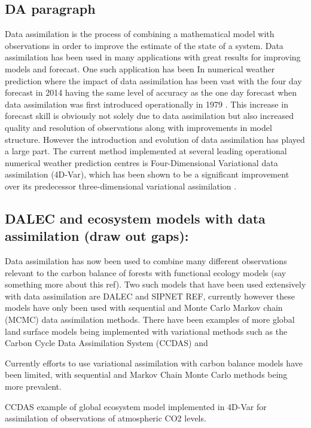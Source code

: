 \documentclass[11pt]{article}
\begin{document}
\subsection{DA paragraph}
Data assimilation is the process of combining a mathematical model with observations in order to improve the estimate of the state of a system. Data assimilation has been used in many applications with great results for improving models and forecast. One such application has been In numerical weather prediction where the impact of data assimilation has been vast with the four day forecast in 2014 having the same level of accuracy as the one day forecast when data assimilation was first introduced operationally in 1979 \citep{rabier2005overview, kalnay2003atmospheric}. This increase in forecast skill is obviously not solely due to data assimilation but also increased quality and resolution of observations along with improvements in model structure. However the introduction and evolution of data assimilation has played a large part. The current method implemented at several leading operational numerical weather prediction centres is Four-Dimensional Variational data assimilation (4D-Var), which has been shown to be a significant improvement over its predecessor three-dimensional variational assimilation \citep{lorenc2005does}.

\subsection{DALEC and ecosystem models with data assimilation (draw out gaps):}

Data assimilation has now been used to combine many different observations relevant to the carbon balance of forests with functional ecology models \citep{zobitz2011primer} (say something more about this ref). Two such models that have been used extensively with data assimilation are DALEC and SIPNET REF,  currently however these models have only been used with sequential and Monte Carlo Markov chain (MCMC) data assimilation methods. There have been examples of more global land surface models being implemented with variational methods such as the Carbon Cycle Data Assimilation System (CCDAS) and 

Currently efforts to use variational assimilation with carbon balance models have been limited, with sequential and Markov Chain Monte Carlo methods being more prevalent.

CCDAS example of global ecosystem model implemented in 4D-Var for assimilation of observations of atmospheric CO2 levels.
\end{document}
